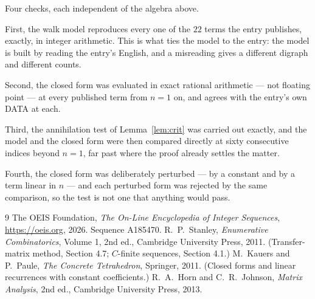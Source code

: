 \documentclass[11pt,a4paper]{article}
\theoremstyle{plain}
\theoremstyle{definition}
\begin{document}
Four checks, each independent of the algebra above.

First, the walk model reproduces every one of the $22$ terms the entry publishes,
exactly, in integer arithmetic. This is what ties the model to the entry: the model is built
by reading the entry's English, and a misreading gives a different digraph and different
counts.

Second, the closed form was evaluated in exact rational arithmetic --- not floating point ---
at every published term from $n=1$ on, and agrees with the entry's own DATA at each.

Third, the annihilation test of Lemma~\ref{lem:crit} was carried out exactly, and the model
and the closed form were then compared directly at sixty consecutive indices beyond
$n=1$, far past where the proof already settles the matter.

Fourth, the closed form was deliberately perturbed --- by a constant and by a term linear in
$n$ --- and each perturbed form was rejected by the same comparison, so the test is not one
that anything would pass.

\begin{thebibliography}{9}
 The OEIS Foundation, \emph{The On-Line Encyclopedia of Integer
Sequences}, \url{https://oeis.org}, 2026. Sequence A185470.
 R.~P.~Stanley, \emph{Enumerative Combinatorics}, Volume 1, 2nd ed.,
Cambridge University Press, 2011. (Transfer-matrix method, Section 4.7; $C$-finite sequences,
Section 4.1.)
 M.~Kauers and P.~Paule, \emph{The Concrete Tetrahedron}, Springer, 2011.
(Closed forms and linear recurrences with constant coefficients.)
 R.~A.~Horn and C.~R.~Johnson, \emph{Matrix Analysis}, 2nd ed., Cambridge
University Press, 2013.
\end{thebibliography}
\end{document}

